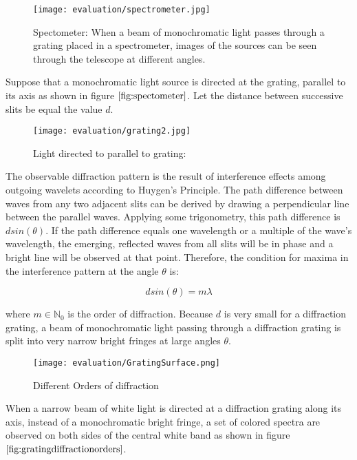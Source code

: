 \begin{figure}[H]
  \centering
  \texttt{[image: evaluation/spectrometer.jpg]}
  \caption[Spectometer]{Spectometer: When a beam of monochromatic light passes through a grating placed in a spectrometer, images of the sources can be seen through the telescope at different angles.}
\label{fig:spectometer}
\end{figure}

Suppose that a monochromatic light source is directed at the grating, parallel to its axis as shown in figure $\ref{fig:spectometer}$. Let the distance between successive slits be equal the value $d$.

\begin{figure}[H]
  \centering
  \texttt{[image: evaluation/grating2.jpg]}
  \caption{Light directed to parallel to grating:}
  \label{fig:lighthitsgrating}
\end{figure}

The observable diffraction pattern is the result of interference effects among outgoing wavelets according to Huygen's Principle. The path difference between waves from any two adjacent slits can be derived by drawing a perpendicular line between the parallel waves. Applying some trigonometry, this path difference is $d sin(\theta)$. If the path difference equals one wavelength or a multiple of the wave's wavelength, the emerging, reflected waves from all slits will be in phase and a bright line will be observed at that point. Therefore, the condition for maxima in the interference pattern at the angle $\theta$ is: 

\begin{equation}
 d sin(\theta) = m \lambda 
\label{eq:simplegratingequation}
\end{equation}

where $m \in \mathds{N}_0$ is the order of diffraction. Because $d$ is very small for a diffraction grating, a beam of monochromatic light passing through a diffraction grating is split into very narrow bright fringes at large angles $\theta$.

\begin{figure}[H]
  \centering
  \texttt{[image: evaluation/GratingSurface.png]}
  \caption[Diffraction Orders]{Different Orders of diffraction}
\label{fig:gratingdiffractionorders}
\end{figure}

When a narrow beam of white light is directed at a diffraction grating along its axis, instead of a monochromatic bright fringe, a set of colored spectra are observed on both sides of the central white band as shown in figure $\ref{fig:gratingdiffractionorders}$.

